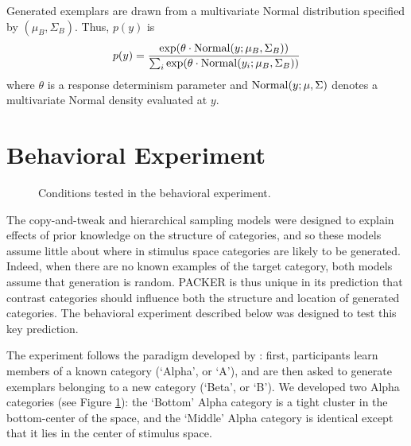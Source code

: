 \documentclass[10pt,letterpaper]{article}
\begin{document}
Generated exemplars are drawn from a multivariate Normal distribution specified by $(\mu_{B}, \Sigma_{B})$. Thus, $p(y)$ is
\begin{equation}
  p(y) = \dfrac
    {\exp( \theta \cdot {\rm Normal}(y; \mu_{B}, \Sigma_{B}))}
    {\sum_i \exp( \theta \cdot {\rm Normal}(y_i; \mu_{B}, \Sigma_{B}))} 
\end{equation}
where $\theta$ is a response determinism parameter and ${\rm Normal}(y; \mu, \Sigma)$ denotes a multivariate Normal density evaluated at $y$. 

\section{Behavioral Experiment}

\begin{figure}
    \begin{center}
    
    \caption{Conditions tested in the behavioral experiment.}
    \label{fig:middle-bottom-conditions}
    \end{center}
\end{figure}


The copy-and-tweak and hierarchical sampling models were designed to explain effects of prior knowledge on the structure of categories, and so these models assume little about where in stimulus space categories are likely to be generated. Indeed, when there are no known examples of the target category, both models assume that generation is random. PACKER is thus unique in its prediction that contrast categories should influence both the structure and location of generated categories. The behavioral experiment described below was designed to test this key prediction. 

The experiment follows the paradigm developed by \citet{jern2013probabilistic}: first, participants learn members of a known category (`Alpha', or `A'), and are then asked to generate exemplars belonging to a new category (`Beta', or `B'). We developed two Alpha categories (see Figure \ref{fig:middle-bottom-conditions}): the `Bottom' Alpha category is a tight cluster in the bottom-center of the space, and the `Middle' Alpha category is identical except that it lies in the center of stimulus space.



\end{document}
